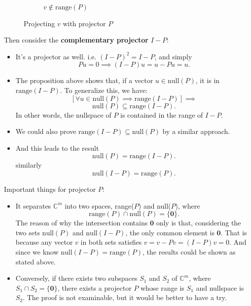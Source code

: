 \begin{itemize}
\begin{figure}[H]
\begin{subfigure}[b]{0.5\textwidth}
      \caption{$v \notin \text{range}(P)$}
      \label{outrange}
    \end{subfigure}
    \caption{Projecting $v$ with projector $P$}
  \end{figure}
\end{itemize}
Then consider the \textbf{complementary projector} $I - P$:
\begin{itemize}
  \item It's a projector as well. i.e. $(I - P)^2 = I - P$, and simply
    \[
      Pu = 0 \implies (I - P)u = u - Pu = u
    .\]
  \item The proposition above shows that, if a vector $u \in \text{null}(P)$, it is in $\text{range}(I - P)$. To generalize this, we have:
    \[
      [\forall u \in \text{null}(P) \implies \text{range}(I - P)] \implies
    \]
    \[
      \text{null}(P) \subseteq \text{range}(I - P)
    .\] 
    In other words, the nullspace of $P$ is contained in the range of $I - P$.
  \item We could also prove
    \(
      \text{range}(I - P) \subseteq \text{null}(P)
    \) by a similar approach.
    \item And this leads to the result
      \[
        \text{null}(P) = \text{range}(I - P)
      .\]
      similarly
      \[
        \text{null}(I - P) = \text{range}(P)
      .\] 
\end{itemize}
Important things for projector $P$: 
\begin{itemize}
\item  It separates $\mathbb{C}^{m}$ into two spaces, range($P$) and null($P$), where 
  \[
  \text{range}(P) \cap \text{null}(P) = \{\textbf{0}\}
  .\] 
  The reason of why the intersection contains $\textbf{0}$ only is that, considering the two sets $\text{null}(P)$ and $\text{null}(I - P)$, the only common element is $\textbf{0}$. That is because any vector $v$ in both sets satisfies $v = v - Pv = (I - P)v = 0$. And since we know $\text{null}(I - P) = \text{range}(P)$, the results could be shown as stated above. 

\item Conversely, if there exists two subspaces $S_1$ and $S_2$ of $\mathbb{C}^{m}$, where $S_1 \cap S_2 = \{\textbf{0}\}$, there exists a projector $P$ whose range is $S_1$ and nullspace is $S_2$. The proof is not examinable, but it would be better to have a try.
\end{itemize}
